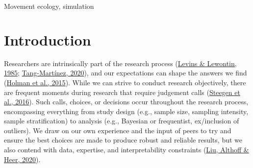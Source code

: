 \documentclass[10pt,a4paper]{article}
\begin{document}
Movement ecology, simulation

\clearpage
\pagestyle{fancy}

\hypertarget{introduction}{%
\section{Introduction}\label{introduction}}

Researchers are intrinsically part of the research process (\protect\hyperlink{ref-levins_dialectical_1985}{Levins \& Lewontin, 1985}; \protect\hyperlink{ref-tang-martinez_history_2020}{Tang-Martínez, 2020}), and our expectations can shape the answers we find (\protect\hyperlink{ref-holman_evidence_2015}{Holman et al., 2015}).
While we can strive to conduct research objectively, there are frequent moments during research that require judgement calls (\protect\hyperlink{ref-steegen_increasing_2016}{Steegen et al., 2016}).
Such calls, choices, or decisions occur throughout the research process, encompassing everything from study design (e.g., sample size, sampling intensity, sample stratification) to analysis (e.g., Bayesian or frequentist, ex/inclusion of outliers).
We draw on our own experience and the input of peers to try and ensure the best choices are made to produce robust and reliable results, but we also contend with data, expertise, and interpretability constraints (\protect\hyperlink{ref-liu_paths_2020}{Liu, Althoff \& Heer, 2020}).
\end{document}

